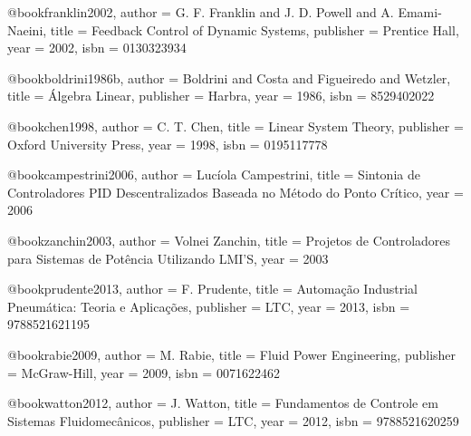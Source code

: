 @book{franklin2002,
  author = {G. F. Franklin and J. D. Powell and A. Emami-Naeini},
  title = {Feedback Control of Dynamic Systems},
  publisher = {Prentice Hall},
  year = {2002},
  isbn = {0130323934}
}

@book{boldrini1986b,
  author = {Boldrini and Costa and Figueiredo and Wetzler},
  title = {Álgebra Linear},
  publisher = {Harbra},
  year = {1986},
  isbn = {8529402022}
}

@book{chen1998,
  author = {C. T. Chen},
  title = {Linear System Theory},
  publisher = {Oxford University Press},
  year = {1998},
  isbn = {0195117778}
}

@book{campestrini2006,
  author = {Lucíola Campestrini},
  title = {Sintonia de Controladores PID Descentralizados Baseada no Método do Ponto Crítico},
  year = {2006}
}

@book{zanchin2003,
  author = {Volnei Zanchin},
  title = {Projetos de Controladores para Sistemas de Potência Utilizando LMI'S},
  year = {2003}
}

%

@book{prudente2013,
  author = {F. Prudente},
  title = {Automação Industrial Pneumática: Teoria e Aplicações},
  publisher = {LTC},
  year = {2013},
  isbn = {9788521621195}
}

@book{rabie2009,
  author = {M. Rabie},
  title = {Fluid Power Engineering},
  publisher = {McGraw-Hill},
  year = {2009},
  isbn = {0071622462}
}

@book{watton2012,
  author = {J. Watton},
  title = {Fundamentos de Controle em Sistemas Fluidomecânicos},
  publisher = {LTC},
  year = {2012},
  isbn = {9788521620259}
}

